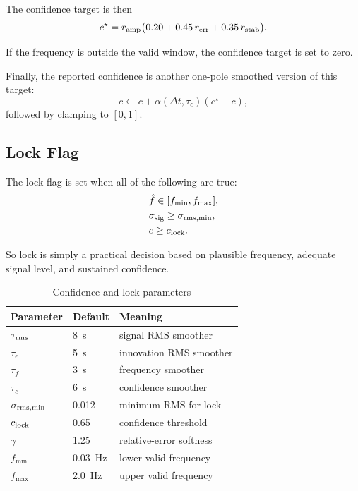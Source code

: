 \documentclass[conference]{IEEEtran}
\begin{document}
    The confidence target is then
    \begin{equation}
        c^\star =
        r_{\rm amp}\bigl(0.20 + 0.45\,r_{\rm err} + 0.35\,r_{\rm stab}\bigr).
    \end{equation}

    If the frequency is outside the valid window, the confidence target is set
    to zero.

    Finally, the reported confidence is another one-pole smoothed version of this
    target:
    \begin{equation}
        c \leftarrow c + \alpha(\Delta t,\tau_c)(c^\star-c),
    \end{equation}
    followed by clamping to $[0,1]$.

    \subsection{Lock Flag}

    The lock flag is set when all of the following are true:
    \begin{align}
        &\hat f \in [f_{\min},f_{\max}],\\
        &\sigma_{\rm sig} \ge \sigma_{\rm rms,min},\\
        &c \ge c_{\rm lock}.
    \end{align}

    So lock is simply a practical decision based on plausible frequency, adequate
    signal level, and sustained confidence.

    \begin{table}[t]
        \centering
        \caption{Confidence and lock parameters}
        \label{tab:lock}
        \small
        \begin{tabular}{@{}lll@{}}
            \toprule
            Parameter & Default & Meaning \\
            \midrule
            $\tau_{\rm rms}$ & \SI{8}{s} & signal RMS smoother \\
            $\tau_e$ & \SI{5}{s} & innovation RMS smoother \\
            $\tau_f$ & \SI{3}{s} & frequency smoother \\
            $\tau_c$ & \SI{6}{s} & confidence smoother \\
            $\sigma_{\rm rms,min}$ & 0.012 & minimum RMS for lock \\
            $c_{\rm lock}$ & 0.65 & confidence threshold \\
            $\gamma$ & 1.25 & relative-error softness \\
            $f_{\min}$ & \SI{0.03}{Hz} & lower valid frequency \\
            $f_{\max}$ & \SI{2.0}{Hz} & upper valid frequency \\
            \bottomrule
        \end{tabular}
    \end{table}
\end{document}
